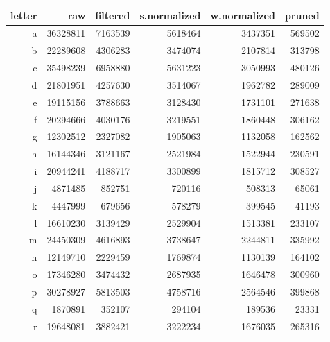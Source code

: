 \FloatBarrier{}
\begin{table}[ht]
    \centering
    \begin{tabularx}{\textwidth}{r R R R R R}
        \toprule
        letter & raw & filtered & s.normalized & w.normalized & pruned\\
        \midrule
        a & \num{36328811} & \num{7163539} & \num{5618464} & \num{3437351} & \num{569502}\\
        b & \num{22289608} & \num{4306283} & \num{3474074} & \num{2107814} & \num{313798}\\
        c & \num{35498239} & \num{6958880} & \num{5631223} & \num{3050993} & \num{480126}\\
        d & \num{21801951} & \num{4257630} & \num{3514067} & \num{1962782} & \num{289009}\\
        e & \num{19115156} & \num{3788663} & \num{3128430} & \num{1731101} & \num{271638}\\
        f & \num{20294666} & \num{4030176} & \num{3219551} & \num{1860448} & \num{306162}\\
        g & \num{12302512} & \num{2327082} & \num{1905063} & \num{1132058} & \num{162562}\\
        h & \num{16144346} & \num{3121167} & \num{2521984} & \num{1522944} & \num{230591}\\
        i & \num{20944241} & \num{4188717} & \num{3300899} & \num{1815712} & \num{308527}\\
        j & \num{4871485} & \num{852751} & \num{720116} & \num{508313} & \num{65061}\\
        k & \num{4447999} & \num{679656} & \num{578279} & \num{399545} & \num{41193}\\
        l & \num{16610230} & \num{3139429} & \num{2529904} & \num{1513381} & \num{233107}\\
        m & \num{24450309} & \num{4616893} & \num{3738647} & \num{2244811} & \num{335992}\\
        n & \num{12149710} & \num{2229459} & \num{1769874} & \num{1130139} & \num{164102}\\
        o & \num{17346280} & \num{3474432} & \num{2687935} & \num{1646478} & \num{300960}\\
        p & \num{30278927} & \num{5813503} & \num{4758716} & \num{2564546} & \num{399868}\\
        q & \num{1870891} & \num{352107} & \num{294104} & \num{189536} & \num{23331}\\
        r & \num{19648081} & \num{3882421} & \num{3222234} & \num{1676035} & \num{265316}\\

\end{tabularx}
\end{table}
